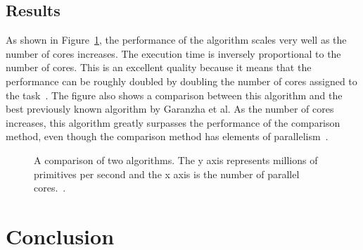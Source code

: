 \documentclass{sig-alternate}
\begin{document}
%



\subsection{Results}
\label{sec:results}

As shown in Figure~\ref{fig:RadixCores}, the performance of the algorithm scales very well as the number of cores increases. The execution time is inversely proportional to the number of cores. This is an excellent quality because it means that the performance can be roughly doubled by doubling the number of cores assigned to the task~\cite{Karras:2012}. The figure also shows a comparison between this algorithm and the best previously known algorithm by Garanzha et al. As the number of cores increases, this algorithm greatly surpasses the performance of the comparison method, even though the comparison method has elements of parallelism~\cite{Garanzha:2011}.


\begin{figure}
\centering
{}
\caption{A comparison of two algorithms. The y axis represents millions of primitives per second and the x axis is the number of parallel cores.~\cite{Karras:2012}.}
\label{fig:RadixCores}
\end{figure}

\section{Conclusion}
\label{sec:conclusion}
\end{document}
